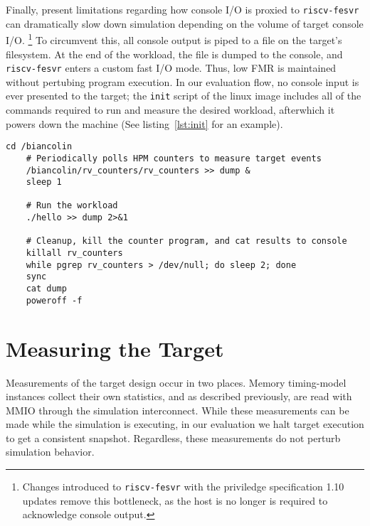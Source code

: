 Finally, present limitations regarding how console I/O is proxied to
\texttt{riscv-fesvr} can dramatically slow down simulation depending on the
volume of target console I/O. \footnote{Changes introduced to
\texttt{riscv-fesvr} with the priviledge specification 1.10 updates remove this
bottleneck, as the host is no longer is required to acknowledge console
output.} To circumvent this, all console output is piped to a file on the
target's filesystem. At the end of the workload, the file is dumped to the
console, and \texttt{riscv-fesvr} enters a custom fast I/O mode.  Thus, low FMR
is maintained without pertubing program execution. In our evaluation flow, no
console input is ever presented to the target; the \texttt{init} script of the
linux image includes all of the commands required to run and measure the
desired workload, afterwhich it powers down the machine (See listing~\ref{lst:init} for an example).\\


\lstset{style=init}

\begin{lstlisting}[caption={An example init script generated during the build process},label={lst:init}]
    cd /biancolin
    # Periodically polls HPM counters to measure target events
    /biancolin/rv_counters/rv_counters >> dump &
    sleep 1

    # Run the workload
    ./hello >> dump 2>&1

    # Cleanup, kill the counter program, and cat results to console
    killall rv_counters
    while pgrep rv_counters > /dev/null; do sleep 2; done
    sync
    cat dump
    poweroff -f
\end{lstlisting}

\section{Measuring the Target}

Measurements of the target design occur in two places.
Memory timing-model instances collect their own statistics, and
as described previously, are read with MMIO through the simulation
interconnect. While these measurements can be made while the simulation is
executing, in our evaluation we halt target execution to get a consistent
snapshot. Regardless, these measurements do not perturb simulation behavior.

